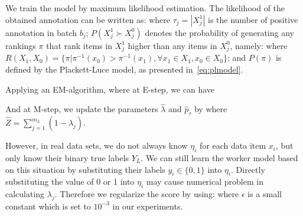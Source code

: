 We train the model by maximum likelihood estimation.
The likelihood of the obtained annotation can be written as:
\beal{
	L = %
        \prod_{j=1}^{m_L} \biggl[
		\lambda \underbrace{
            \prod_{t=1}^{k} \eta_{jt}^{y_{jt}} (1 - \eta_{jt})^{(1 - y_{jt})}
        }_{\text{independent judging}}
		+ (1 - \lambda) \underbrace{
            p_{\tau_j} P(X_{j}^1 \succ X_{j}^0)
        }_{\text{relative judging}}
	\biggr]
}%
where $\tau_j = |X_{j}^1|$ is the number of positive annotation in batch $b_j$;
$P(X_{j}^1 \succ X_{j}^0)$ denotes the probability of generating any rankings $\pi$
that rank items in $X_{j}^1$ higher than any items in $X_{j}^0$,
namely:
%
where $R(X_1, X_0) = \{ \pi |\pi^{-1}(x_{0}) > \pi^{-1}(x_{1}),  \forall x_{1} \in X_1, x_0 \in X_0 \}$;
and $P(\pi)$ is defined by the Plackett-Luce model, as presented in~\eqref{eq:plmodel}.

Applying an EM-algorithm, where at E-step, we can have

And at M-step, we update the parameters $\hat{\lambda}$ and $\hat{p}_{\tau}$ by
%
where $\hat{Z} = \sum_{j=1}^{m_L} (1 - \hat{\lambda}_j)$.


However, in real data sets, we do not always know $\eta_i$ for each data item $x_i$,
but only know their binary true labels $Y_L$.
We can still learn the worker model based on this situation
by substituting their labels $y_i \in \{0, 1\}$ into $\eta_i$.
Directly substituting the value of 0 or 1 into $\eta_i$ may cause numerical problem in calculating $\lambda_j$.
Therefore we regularize the score by using:
%
where $\epsilon$ is a small constant which is set to $10^{-3}$ in our experiments.





